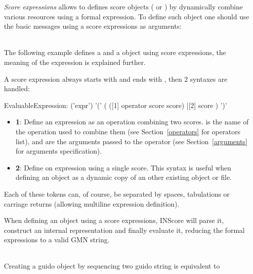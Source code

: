 \label{scoreExpr}

\emph{Score expressions} allows to defines score objects ( or ) by dynamically combine various resources using a formal expression. To define such object one should use the basic  messages using a score expressions as arguments:

\example\\
The following example defines a  and a  object using score expressions, the meaning of the expression is explained further.


\label{exprSyntax}

A score expression  always starts with  and ends with \OSC{)}, then 
2 syntaxes are handled:

\begin{rail}
EvaluableExpression: 	('expr')
						'('
						 (
						  ([1] operator score score)
						  |[2] score
						 )
						')'
\end{rail}

\begin{itemize}
\item \textbf{1}: Define an expression as an operation combining two scores.  is the name of the operation used to combine them (see Section~\ref{operators} for operators list), and  are the arguments passed to  the operator (see Section~\ref{arguments} for arguments specification).
\item \textbf{2}: Define on expression using a single score. This syntax is useful when defining an object as a dynamic copy of an other existing object or file.
\end{itemize}
Each of these tokens can, of course, be separated by spaces, tabulations or carriage returns (allowing multiline expression definition).

When defining an object using a score expressions, INScore will parse it, construct an internal representation and finally evaluate it, reducing the formal expressions to a valid GMN string.

\example \\
Creating a guido object by sequencing two guido string
is equivalent to

